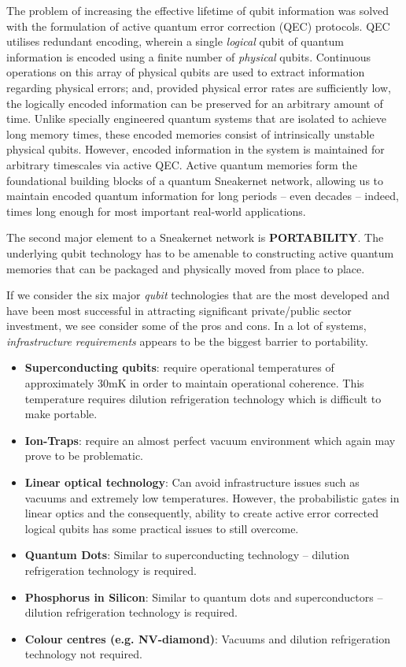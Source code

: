\documentclass[twocolumn, aps, rmp, amsmath, amssymb, nofootinbib, superscriptaddress, longbibliography, floatfix, table-of-contents, eqsecnum]{revtex4-2}
\begin{document}
The problem of increasing the effective lifetime of qubit information was solved with the formulation of active quantum error correction (QEC) protocols. QEC utilises redundant encoding, wherein a single \textit{logical} qubit of quantum information is encoded using a finite number of \textit{physical} qubits. Continuous operations on this array of physical qubits are used to extract information regarding physical errors; and, provided physical error rates are sufficiently low, the logically encoded information can be preserved for an arbitrary amount of time. Unlike specially engineered quantum systems that are isolated to achieve long memory times, these encoded memories consist of intrinsically unstable physical qubits. However, encoded information in the system is maintained for arbitrary timescales via active QEC. Active quantum memories form the foundational building blocks of a quantum Sneakernet network, allowing us to maintain encoded quantum information for long periods -- even decades -- indeed, times long enough for most important real-world applications. 

The second major element to a Sneakernet network is \textbf{PORTABILITY}. The underlying qubit technology has to be amenable to constructing active quantum memories that can be packaged and physically moved from place to place. 

If we consider the six major \textit{qubit} technologies that are the most developed and have been most successful in attracting significant private/public sector investment, we see consider some of the pros and cons. In a lot of systems, \textit{infrastructure requirements} appears to be the biggest barrier to portability. 
\begin{itemize}
\item \textbf{Superconducting qubits}: require operational temperatures of approximately 30mK in order to maintain operational coherence. This temperature requires dilution refrigeration technology which is difficult to make portable. 
\item \textbf{Ion-Traps}: require an almost perfect vacuum environment which again may prove to be problematic. 
\item \textbf{Linear optical technology}: Can avoid infrastructure issues such as vacuums and extremely low temperatures. However, the probabilistic gates in linear optics and the consequently, ability to create active error corrected logical qubits has some practical issues to still overcome.  
\item \textbf{Quantum Dots}: Similar to superconducting technology -- dilution refrigeration technology is required.
\item \textbf{Phosphorus in Silicon}: Similar to quantum dots and superconductors -- dilution refrigeration technology is required. 
\item \textbf{Colour centres (e.g. NV-diamond)}: Vacuums and dilution refrigeration technology not required. 
\end{itemize}
\end{document}
